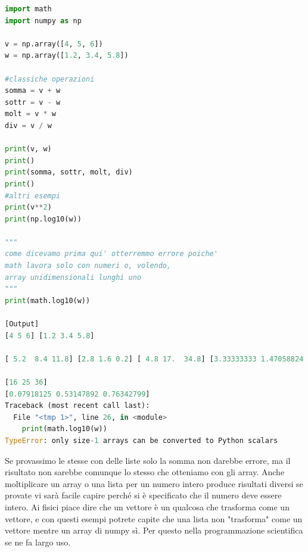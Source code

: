 \documentclass[10pt,a4paper]{article}
\begin{document}
\begin{lstlisting}[language=Python]
import math
import numpy as np

v = np.array([4, 5, 6])
w = np.array([1.2, 3.4, 5.8])

#classiche operazioni
somma = v + w
sottr = v - w
molt = v * w
div = v / w

print(v, w)
print()
print(somma, sottr, molt, div)
print()
#altri esempi
print(v**2)
print(np.log10(w))

"""
come dicevamo prima qui' otterremmo errore poiche'
math lavora solo con numeri o, volendo, 
array unidimensionali lunghi uno
"""
print(math.log10(w))

[Output]
[4 5 6] [1.2 3.4 5.8]

[ 5.2  8.4 11.8] [2.8 1.6 0.2] [ 4.8 17.  34.8] [3.33333333 1.47058824 1.03448276]

[16 25 36]
[0.07918125 0.53147892 0.76342799]
Traceback (most recent call last):
  File "<tmp 1>", line 26, in <module>
    print(math.log10(w))
TypeError: only size-1 arrays can be converted to Python scalars

\end{lstlisting}
Se provassimo le stesse con delle liste solo la somma non darebbe errore, ma il risultato non sarebbe comunque lo stesso che otteniamo con gli array. Anche moltiplicare un array o una lista per un numero intero produce risultati diversi se provate vi sarà facile capire perché si è specificato che il numero deve essere intero. Ai fisici piace dire che un vettore è un qualcosa che trasforma come un vettore, e con questi esempi potrete capite che una lista non "trasforma" come un vettore mentre un array di numpy sì. Per questo nella programmazione scientifica se ne fa largo uso.
\end{document}
